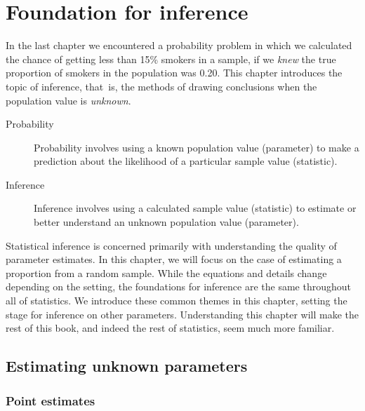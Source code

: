 \chapter{Foundation for inference}
\label{foundationsForInference}

In the last chapter we encountered a probability problem in which we calculated the chance of getting less than 15\% smokers in a sample, if we \emph{knew} the true proportion of smokers in the population was 0.20. This chapter introduces the topic of inference, that~is, the methods of drawing conclusions when the population value is \emph{unknown}.

\begin{termBox}{
\vspace{-5mm}
\begin{description}
\item[Probability] Probability involves using a known population value (parameter) to make a prediction about the likelihood of a particular sample value (statistic).
\item[Inference] Inference involves using a calculated sample value (statistic) to estimate or better understand an unknown population value (parameter).
\end{description}
}
\end{termBox}

Statistical inference is concerned primarily with understanding the quality of parameter estimates. In this chapter, we will focus on the case of estimating a proportion from a random sample. While the equations and details change depending on the setting, the foundations for inference are the same throughout all of statistics. We introduce these common themes in this chapter, setting the stage for inference on other parameters. Understanding this chapter will make the rest of this book, and indeed the rest of statistics, seem much more familiar.

\section[Estimating unknown parameters]{Estimating unknown parameters }
\subsection{Point estimates}
\label{pointEstimates}


